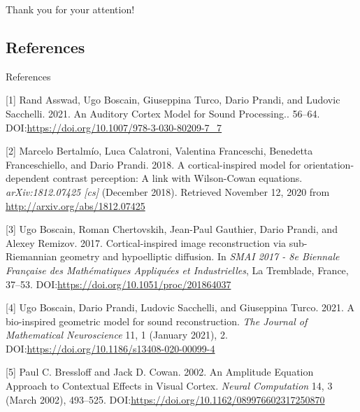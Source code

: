 \documentclass[10pt,american,ignorenonframetext,aspectratio=1610]{beamer}
\theoremstyle{remark}
\begin{document}
\begin{frame}

\centering

\huge Thank you for your attention!

\end{frame}

\hypertarget{references}{%
\subsection{References}\label{references}}

\begin{frame}[allowframebreaks]{References}
\protect\hypertarget{references-1}{}

\hypertarget{refs}{}
\leavevmode\hypertarget{ref-asswad2021}{}%
{[}1{]} Rand Asswad, Ugo Boscain, Giuseppina Turco, Dario Prandi, and
Ludovic Sacchelli. 2021. An Auditory Cortex Model for Sound Processing..
56--64. DOI:\url{https://doi.org/10.1007/978-3-030-80209-7_7}

\leavevmode\hypertarget{ref-bertalmio2018}{}%
{[}2{]} Marcelo Bertalmío, Luca Calatroni, Valentina Franceschi,
Benedetta Franceschiello, and Dario Prandi. 2018. A cortical-inspired
model for orientation-dependent contrast perception: A link with
Wilson-Cowan equations. \emph{arXiv:1812.07425 {[}cs{]}} (December
2018). Retrieved November 12, 2020 from
\url{http://arxiv.org/abs/1812.07425}

\leavevmode\hypertarget{ref-boscain2017}{}%
{[}3{]} Ugo Boscain, Roman Chertovskih, Jean-Paul Gauthier, Dario
Prandi, and Alexey Remizov. 2017. Cortical-inspired image reconstruction
via sub-Riemannian geometry and hypoelliptic diffusion. In \emph{SMAI
2017 - 8e Biennale Française des Mathématiques Appliquées et
Industrielles}, La Tremblade, France, 37--53.
DOI:\url{https://doi.org/10.1051/proc/201864037}

\leavevmode\hypertarget{ref-boscain2021}{}%
{[}4{]} Ugo Boscain, Dario Prandi, Ludovic Sacchelli, and Giuseppina
Turco. 2021. A bio-inspired geometric model for sound reconstruction.
\emph{The Journal of Mathematical Neuroscience} 11, 1 (January 2021), 2.
DOI:\url{https://doi.org/10.1186/s13408-020-00099-4}

\leavevmode\hypertarget{ref-bressloff2002}{}%
{[}5{]} Paul C. Bressloff and Jack D. Cowan. 2002. An Amplitude Equation
Approach to Contextual Effects in Visual Cortex. \emph{Neural
Computation} 14, 3 (March 2002), 493--525.
DOI:\url{https://doi.org/10.1162/089976602317250870}


\end{frame}
\end{document}
